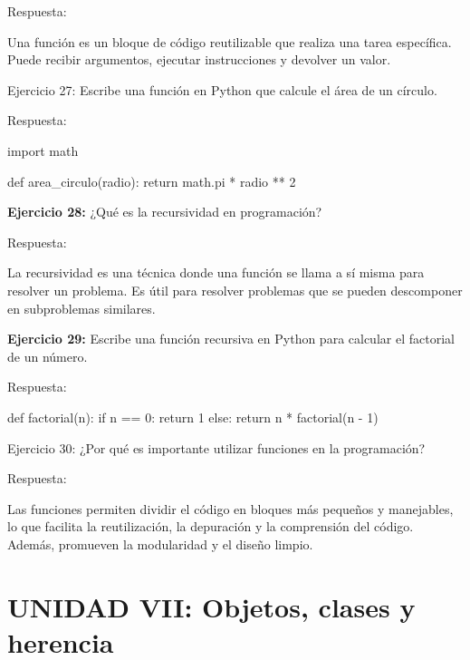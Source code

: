 \documentclass[
  a4paper,
  DIV=11,
  numbers=noendperiod,
  onepage,
  openany]{scrreprt}
\newenvironment{Shaded}{\begin{snugshade}}{\end{snugshade}}
\newcommand{\ControlFlowTok}[1]{\textcolor[rgb]{0.00,0.23,0.31}{#1}}
\newcommand{\DecValTok}[1]{\textcolor[rgb]{0.68,0.00,0.00}{#1}}
\newcommand{\ImportTok}[1]{\textcolor[rgb]{0.00,0.46,0.62}{#1}}
\newcommand{\KeywordTok}[1]{\textcolor[rgb]{0.00,0.23,0.31}{#1}}
\newcommand{\NormalTok}[1]{\textcolor[rgb]{0.00,0.23,0.31}{#1}}
\newcommand{\OperatorTok}[1]{\textcolor[rgb]{0.37,0.37,0.37}{#1}}
\begin{document}
Respuesta:

Una función es un bloque de código reutilizable que realiza una tarea
específica. Puede recibir argumentos, ejecutar instrucciones y devolver
un valor.

Ejercicio 27: Escribe una función en Python que calcule el área de un
círculo.

Respuesta:

\begin{Shaded}
\begin{Highlighting}[]
\ImportTok{import}\NormalTok{ math}

\KeywordTok{def}\NormalTok{ area\_circulo(radio):}
\ControlFlowTok{return}\NormalTok{ math.pi }\OperatorTok{*}\NormalTok{ radio }\OperatorTok{**} \DecValTok{2}
\end{Highlighting}
\end{Shaded}

\textbf{Ejercicio 28:} ¿Qué es la recursividad en programación?

Respuesta:

La recursividad es una técnica donde una función se llama a sí misma
para resolver un problema. Es útil para resolver problemas que se pueden
descomponer en subproblemas similares.

\textbf{Ejercicio 29:} Escribe una función recursiva en Python para
calcular el factorial de un número.

Respuesta:

\begin{Shaded}
\begin{Highlighting}[]
\KeywordTok{def}\NormalTok{ factorial(n):}
    \ControlFlowTok{if}\NormalTok{ n }\OperatorTok{==} \DecValTok{0}\NormalTok{:}
        \ControlFlowTok{return} \DecValTok{1}
    \ControlFlowTok{else}\NormalTok{:}
        \ControlFlowTok{return}\NormalTok{ n }\OperatorTok{*}\NormalTok{ factorial(n }\OperatorTok{{-}} \DecValTok{1}\NormalTok{)}
\end{Highlighting}
\end{Shaded}

Ejercicio 30: ¿Por qué es importante utilizar funciones en la
programación?

Respuesta:

Las funciones permiten dividir el código en bloques más pequeños y
manejables, lo que facilita la reutilización, la depuración y la
comprensión del código. Además, promueven la modularidad y el diseño
limpio.

\hypertarget{unidad-vii-objetos-clases-y-herencia-1}{%
\section{UNIDAD VII: Objetos, clases y
herencia}\label{unidad-vii-objetos-clases-y-herencia-1}}
\end{document}
